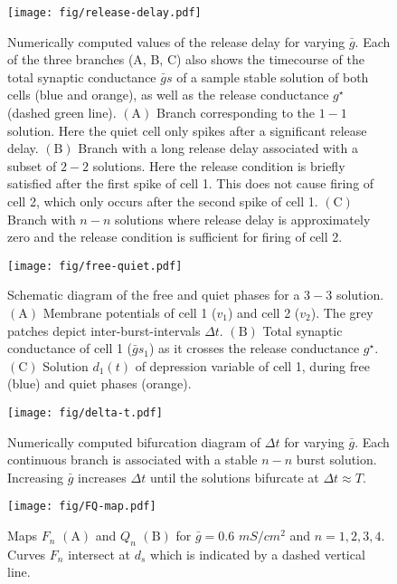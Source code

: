 \documentclass[utf8, draft]{frontiersFPHY} %
\newcommand{\gbar}{\bar g}
\newcommand{\delt}{\Delta t}
\begin{document}
\begin{figure}[h!]
  \centering
  \texttt{[image: fig/release-delay.pdf]}
  \caption{Numerically computed values of the release delay for varying \(\gbar\). Each of
    the three branches (A, B, C) also shows the timecourse of the total synaptic
    conductance \(\gbar s\) of a sample stable solution of both cells (blue and orange),
    as well as the release conductance \(g^{\star}\) (dashed green line).
    \(\bm{\mathrm{(A)}}\) Branch corresponding to the \(1-1\) solution. Here the quiet
    cell only spikes after a significant release delay. \(\bm{\mathrm{(B)}}\) Branch with
    a long release delay associated with a subset of \(2-2\) solutions. Here the release
    condition is briefly satisfied after the first spike of cell 1. This does not cause
    firing of cell 2, which only occurs after the second spike of cell 1.
    \(\bm{\mathrm{(C)}}\) Branch with \(n-n\) solutions  where release delay is
    approximately zero and the release condition is sufficient for firing of cell 2.
    ~\label{fig:release-delay}}
\end{figure}

\begin{figure}[h!]
  \centering
  \texttt{[image: fig/free-quiet.pdf]}
  \caption{Schematic diagram of the free and quiet phases for a \(3-3\) solution.
    \(\bm{\mathrm{(A)}}\) Membrane potentials of cell 1 (\(v_{1}\)) and cell 2 (\(v_{2}\)).
    The grey patches depict inter-burst-intervals \(\delt\). \(\bm{\mathrm{(B)}}\) Total
    synaptic conductance of cell 1 (\(\gbar s_1\)) as it crosses the release conductance
    \(g^{\star}\). \(\bm{\mathrm{(C)}}\) Solution \(d_1(t)\) of depression variable of cell
    1, during free (blue) and quiet phases (orange).~\label{fig:free-quiet1}}
\end{figure}

\begin{figure}[h!]
  \centering
  \texttt{[image: fig/delta-t.pdf]}
  \caption{Numerically computed bifurcation diagram of \(\delt\) for varying \(\gbar\).
    Each continuous branch is associated with a stable \(n-n\) burst solution. Increasing
    \(\gbar\) increases \(\Delta t\) until the solutions bifurcate at \(\Delta t\approx
    T\).~\label{fig:delta-t}}
\end{figure}

\begin{figure}[h!]
  \centering
  \texttt{[image: fig/FQ-map.pdf]}
  \caption{Maps \(F_n\) \(\bm{\mathrm{(A)}}\) and \(Q_n\) \(\bm{\mathrm{(B)}}\) for
  \(\gbar=0.6\) \(\si{mS/cm^{2}}\) and \(n=1,2,3,4\). Curves \(F_n\) intersect at
  \(d_{s}\) which is indicated by a dashed vertical line.~\label{fig:FQ-map}}
\end{figure}
\end{document}
